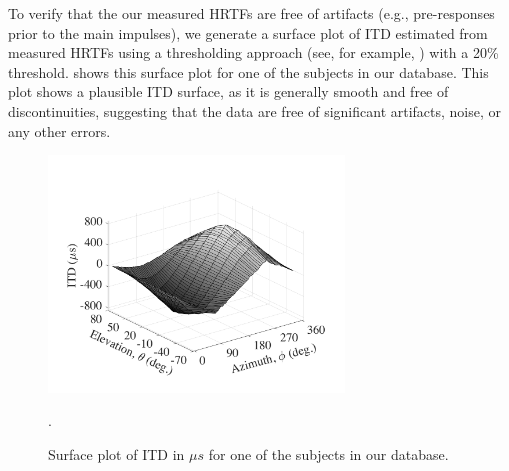 To verify that the our measured HRTFs are free of artifacts (e.g., pre-responses prior to the main impulses), we generate a surface plot of ITD estimated from measured HRTFs using a thresholding approach (see, for example, \citet{KatzNoisternig2014}) with a 20\% threshold.
 shows this surface plot for one of the subjects in our database.
This plot shows a plausible ITD surface, as it is generally smooth and free of discontinuities, suggesting that the data are free of significant artifacts, noise, or any other errors.

\begin{figure}[t]
\begin{center}
\includegraphics[width = 0.7\textwidth]{a4_HRTF_measurements/figures/Sample_ITD_surface.pdf}
\caption[Surface plot of typical interaural time differences.]{Surface plot of ITD in $\mu s$ for one of the subjects in our database.}.
\label{fig:Sample_ITD_surface}
\end{center}
\end{figure}